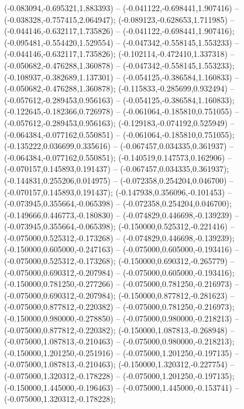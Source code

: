  (-0.083094,-0.695321,1.883393) -- (-0.041122,-0.698441,1.907416) -- (-0.038328,-0.757415,2.064947);
 (-0.089123,-0.628653,1.711985) -- (-0.044146,-0.632117,1.735826) -- (-0.041122,-0.698441,1.907416);
 (-0.095481,-0.554420,1.529554) -- (-0.047342,-0.558145,1.553233) -- (-0.044146,-0.632117,1.735826);
 (-0.102114,-0.472410,1.337318) -- (-0.050682,-0.476288,1.360878) -- (-0.047342,-0.558145,1.553233);
 (-0.108937,-0.382689,1.137301) -- (-0.054125,-0.386584,1.160833) -- (-0.050682,-0.476288,1.360878);
 (-0.115833,-0.285699,0.932494) -- (-0.057612,-0.289453,0.956163) -- (-0.054125,-0.386584,1.160833);
 (-0.122645,-0.182366,0.726978) -- (-0.061064,-0.185810,0.751055) -- (-0.057612,-0.289453,0.956163);
 (-0.129183,-0.074192,0.525949) -- (-0.064384,-0.077162,0.550851) -- (-0.061064,-0.185810,0.751055);
 (-0.135222,0.036699,0.335616) -- (-0.067457,0.034335,0.361937) -- (-0.064384,-0.077162,0.550851);
 (-0.140519,0.147573,0.162906) -- (-0.070157,0.145893,0.191437) -- (-0.067457,0.034335,0.361937);
 (-0.144831,0.255206,0.014975) -- (-0.072358,0.254204,0.046700) -- (-0.070157,0.145893,0.191437);
 (-0.147938,0.356096,-0.101453) -- (-0.073945,0.355664,-0.065398) -- (-0.072358,0.254204,0.046700);
 (-0.149666,0.446773,-0.180830) -- (-0.074829,0.446698,-0.139239) -- (-0.073945,0.355664,-0.065398);
 (-0.150000,0.525312,-0.221416) -- (-0.075000,0.525312,-0.173268) -- (-0.074829,0.446698,-0.139239);
 (-0.150000,0.605000,-0.247163) -- (-0.075000,0.605000,-0.193416) -- (-0.075000,0.525312,-0.173268);
 (-0.150000,0.690312,-0.265779) -- (-0.075000,0.690312,-0.207984) -- (-0.075000,0.605000,-0.193416);
 (-0.150000,0.781250,-0.277266) -- (-0.075000,0.781250,-0.216973) -- (-0.075000,0.690312,-0.207984);
 (-0.150000,0.877812,-0.281623) -- (-0.075000,0.877812,-0.220382) -- (-0.075000,0.781250,-0.216973);
 (-0.150000,0.980000,-0.278850) -- (-0.075000,0.980000,-0.218213) -- (-0.075000,0.877812,-0.220382);
 (-0.150000,1.087813,-0.268948) -- (-0.075000,1.087813,-0.210463) -- (-0.075000,0.980000,-0.218213);
 (-0.150000,1.201250,-0.251916) -- (-0.075000,1.201250,-0.197135) -- (-0.075000,1.087813,-0.210463);
 (-0.150000,1.320312,-0.227754) -- (-0.075000,1.320312,-0.178228) -- (-0.075000,1.201250,-0.197135);
 (-0.150000,1.445000,-0.196463) -- (-0.075000,1.445000,-0.153741) -- (-0.075000,1.320312,-0.178228);
